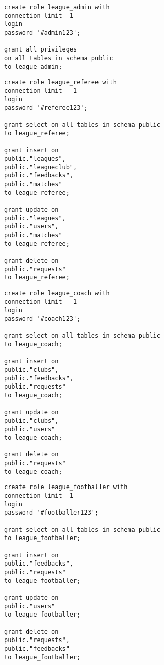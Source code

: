 \begin{lstlisting}[caption={Создание роли администратора и выдыча права}, label={lst:role1}]
create role league_admin with
connection limit -1
login
password '#admin123';

grant all privileges
on all tables in schema public
to league_admin;
\end{lstlisting}
\clearpage
\begin{lstlisting}[caption={Создание роли судьи и выдыча права}, label={lst:role2}]
create role league_referee with
connection limit - 1
login
password '#referee123';

grant select on all tables in schema public
to league_referee;

grant insert on
public."leagues",
public."leagueclub",
public."feedbacks",
public."matches"
to league_referee;	

grant update on
public."leagues",
public."users",
public."matches"
to league_referee;

grant delete on
public."requests"
to league_referee;
\end{lstlisting}

\begin{lstlisting}[caption={Создание роли тренера и выдыча права}, label={lst:role3}]
create role league_coach with
connection limit - 1
login
password '#coach123';

grant select on all tables in schema public
to league_coach;

grant insert on
public."clubs",
public."feedbacks",
public."requests"
to league_coach;

grant update on
public."clubs",
public."users"
to league_coach;

grant delete on
public."requests"
to league_coach;

\end{lstlisting}

\begin{lstlisting}[caption={Создание роли футболиста и выдыча права}, label={lst:role4}]
create role league_footballer with
connection limit -1
login
password '#footballer123';

grant select on all tables in schema public
to league_footballer;

grant insert on
public."feedbacks",
public."requests"
to league_footballer;

grant update on
public."users"
to league_footballer;

grant delete on
public."requests",
public."feedbacks"
to league_footballer;
\end{lstlisting}

